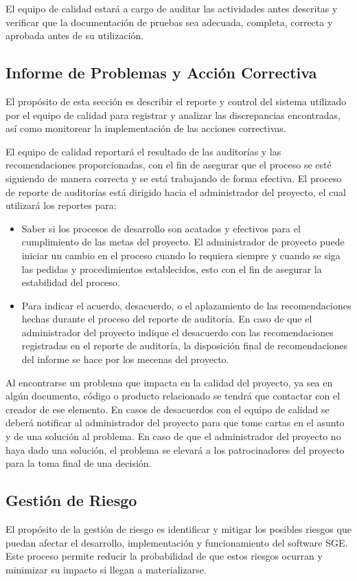 \documentclass[a4paper,10pt]{article}
\begin{document}
	El equipo de calidad estará a cargo de auditar las actividades antes descritas y verificar que la documentación de pruebas sea adecuada, completa, correcta y aprobada antes de su utilización.
	
	\subsection{Informe de Problemas y Acción Correctiva}
	El propósito de esta sección es describir el reporte y control del sistema utilizado por el equipo de calidad para registrar y analizar las discrepancias encontradas, así como monitorear la implementación de las acciones correctivas.
	
	El equipo de calidad reportará el resultado de las auditorías y las recomendaciones proporcionadas, con el fin de asegurar que el proceso se esté siguiendo de manera correcta y se está trabajando de forma efectiva. El proceso de reporte de auditorías está dirigido hacia el administrador del proyecto, el cual utilizará los reportes para:
	\begin{itemize}
		\item Saber si los procesos de desarrollo son acatados y efectivos para el cumplimiento de las metas del proyecto. El administrador de proyecto puede iniciar un cambio en el proceso cuando lo requiera siempre y cuando se siga las pedidas y procedimientos establecidos, esto con el fin de asegurar la estabilidad del proceso.
		\item Para indicar el acuerdo, desacuerdo, o el aplazamiento de las recomendaciones hechas durante el proceso del reporte de auditoría. En caso de que el administrador del proyecto indique el desacuerdo con las recomendaciones registradas en el reporte de auditoría, la disposición final de recomendaciones del informe se hace por los mecenas del proyecto.
	\end{itemize}
	
	Al encontrarse un problema que impacta en la calidad del proyecto, ya sea en algún documento, código o producto relacionado se tendrá que contactar con el creador de ese elemento. En casos de desacuerdos con el equipo de calidad se deberá notificar al administrador del proyecto para que tome cartas en el asunto y de una solución al problema. En caso de que el administrador del proyecto no haya dado una solución, el problema se elevará a los patrocinadores del proyecto para la toma final de una decisión.
	
	\subsection{Gestión de Riesgo}
	El propósito de la gestión de riesgo es identificar y mitigar los posibles riesgos que puedan afectar el desarrollo, implementación y funcionamiento del software SGE. Este proceso permite reducir la probabilidad de que estos riesgos ocurran y minimizar su impacto si llegan a materializarse.
	
\end{document}
